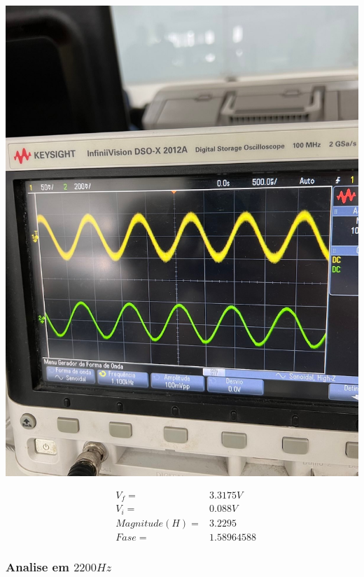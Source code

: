 \documentclass[12pt,twoside, a4paper, twocolumn]{article}
\begin{document}
\begin{adjustbox}{scale=0.18}
    \includegraphics{freq1100.jpeg}
\end{adjustbox}


\begin{equation*}
    \begin{aligned}
         & V_f =          & 3.3175V    \\
         & V_i =          & 0.088V     \\
         & Magnitude(H) = & 3.2295     \\
         & Fase =         & 1.58964588
    \end{aligned}
\end{equation*}






\subsubsection{Analise em $2200Hz$}
\subparagraph*{}
\end{document}
